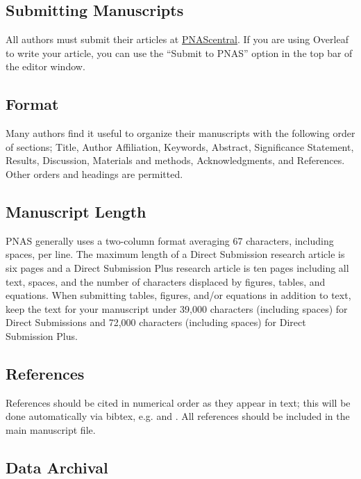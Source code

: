 \documentclass[9pt,twocolumn,twoside,lineno]{pnas-new}
\begin{document}
\subsection*{Submitting Manuscripts}

All authors must submit their articles at \href{http://www.pnascentral.org/cgi-bin/main.plex}{PNAScentral}. If you are using Overleaf to write your article, you can use the ``Submit to PNAS'' option in the top bar of the editor window. 

\subsection*{Format}

Many authors find it useful to organize their manuscripts with the following order of sections;  Title, Author Affiliation, Keywords, Abstract, Significance Statement, Results, Discussion, Materials and methods, Acknowledgments, and References. Other orders and headings are permitted.

\subsection*{Manuscript Length}

PNAS generally uses a two-column format averaging 67 characters, including spaces, per line. The maximum length of a Direct Submission research article is six pages and a Direct Submission Plus research article is ten pages including all text, spaces, and the number of characters displaced by figures, tables, and equations.  When submitting tables, figures, and/or equations in addition to text, keep the text for your manuscript under 39,000 characters (including spaces) for Direct Submissions and 72,000 characters (including spaces) for Direct Submission Plus.

\subsection*{References}

References should be cited in numerical order as they appear in text; this will be done automatically via bibtex, e.g. \cite{belkin2002using} and \cite{berard1994embedding,coifman2005geometric}. All references should be included in the main manuscript file.  

\subsection*{Data Archival}
\end{document}
